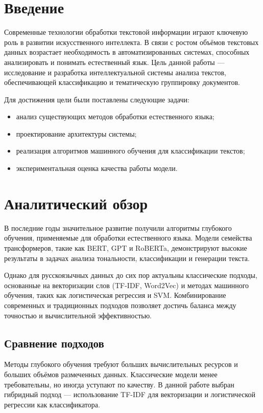 \documentclass[14pt,a4paper]{extarticle}
\begin{document}
\newpage
\section*{Введение}
Современные технологии обработки текстовой информации играют ключевую роль в развитии искусственного интеллекта.
В связи с ростом объёмов текстовых данных возрастает необходимость в автоматизированных системах, способных анализировать и понимать естественный язык.
Цель данной работы — исследование и разработка интеллектуальной системы анализа текстов, обеспечивающей классификацию и тематическую группировку документов.

Для достижения цели были поставлены следующие задачи:
\begin{itemize}
    \item анализ существующих методов обработки естественного языка;
    \item проектирование архитектуры системы;
    \item реализация алгоритмов машинного обучения для классификации текстов;
    \item экспериментальная оценка качества работы модели.
\end{itemize}

\newpage
\section{Аналитический обзор}
В последние годы значительное развитие получили алгоритмы глубокого обучения, применяемые для обработки естественного языка.
Модели семейства трансформеров, такие как BERT, GPT и RoBERTa, демонстрируют высокие результаты в задачах анализа тональности, классификации и генерации текста.

Однако для русскоязычных данных до сих пор актуальны классические подходы, основанные на векторизации слов (TF-IDF, Word2Vec) и методах машинного обучения, таких как логистическая регрессия и SVM.
Комбинирование современных и традиционных подходов позволяет достичь баланса между точностью и вычислительной эффективностью.

\subsection{Сравнение подходов}
Методы глубокого обучения требуют больших вычислительных ресурсов и больших объёмов размеченных данных.
Классические модели менее требовательны, но иногда уступают по качеству.
В данной работе выбран гибридный подход — использование TF-IDF для векторизации и логистической регрессии как классификатора.
\end{document}
